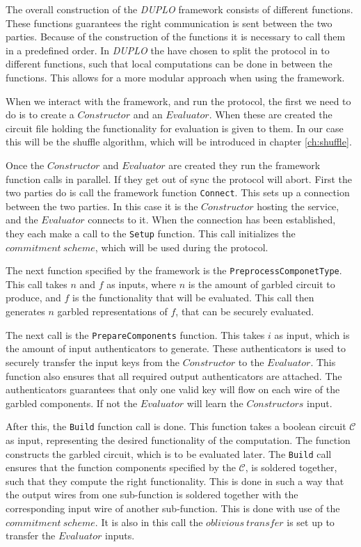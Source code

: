 \documentclass[twoside,11pt,openright]{report}
\newcommand{\DUPLO}{\textit{DUPLO} }
\begin{document}
The overall construction of the \DUPLO framework consists of different functions. These functions guarantees the right communication is sent between the two parties. Because of the construction of the functions it is necessary to call them in a predefined order. In \DUPLO the have chosen to split the protocol in to different functions, such that local computations can be done in between the functions. This allows for a more modular approach when using the framework.

\bigskip

When we interact with the framework, and run the protocol, the first we need to do is to create a $Constructor$ and an $Evaluator$. When these are created the circuit file holding the functionality for evaluation is given to them. In our case this will be the shuffle algorithm, which will be introduced in chapter \ref{ch:shuffle}.

Once the $Constructor$ and $Evaluator$ are created they run the framework function calls in parallel. If they get out of sync the protocol will abort. First the two parties do is call the framework function \verb|Connect|. This sets up a connection between the two parties. In this case it is the $Constructor$ hosting the service, and the $Evaluator$ connects to it. When the connection has been established, they each make a call to the \verb|Setup| function. This call initializes the $commitment~scheme$, which will be used during the protocol.

The next function specified by the framework is the \verb|PreprocessComponetType|. This call takes $n$ and $f$ as inputs, where $n$ is the amount of garbled circuit to produce, and $f$ is the functionality that will be evaluated. This call then generates $n$ garbled representations of $f$, that can be securely evaluated.

The next call is the \verb|PrepareComponents| function. This takes $i$ as input, which is the amount of input authenticators to generate. These authenticators is used to securely transfer the input keys from the $Constructor$ to the $Evaluator$. This function also ensures that all required output authenticators are attached. The authenticators guarantees that only one valid key will flow on each wire of the garbled components. If not the $Evaluator$ will learn the $Constructors$ input.

After this, the \verb|Build| function call is done. This function takes a boolean circuit $\mathcal{C}$ as input, representing the desired functionality of the computation. The function constructs the garbled circuit, which is to be evaluated later. The \verb|Build| call ensures that the function components specified by the $\mathcal{C}$, is soldered together, such that they compute the right functionality. This is done in such a way that the output wires from one sub-function is soldered together with the corresponding input wire of another sub-function. This is done with use of the $commitment~scheme$. It is also in this call the $oblivious~transfer$ is set up to transfer the $Evaluator$ inputs.
\end{document}
